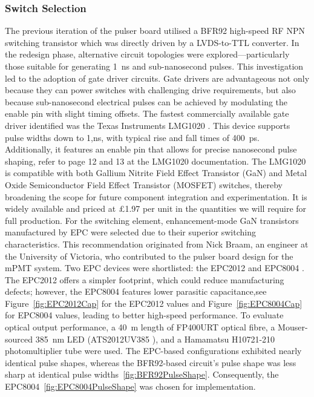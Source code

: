\documentclass[a4paper,11pt]{article}
\begin{document}
\subsubsection{Switch Selection}

The previous iteration of the pulser board utilised a BFR92 \cite{BFR92} high-speed RF NPN switching transistor which was directly driven by a LVDS-to-TTL converter. In the redesign phase, alternative circuit topologies were explored—particularly those suitable for generating 1~ns and sub-nanosecond pulses. This investigation led to the adoption of gate driver circuits. Gate drivers are advantageous not only because they can power switches with challenging drive requirements, but also because sub-nanosecond electrical pulses can be achieved by modulating the enable pin with slight timing offsets. 
The fastest commercially available gate driver identified was the Texas Instruments LMG1020 \cite{LMG1020}. This device supports pulse widths down to 1,ns, with typical rise and fall times of 400~ps. Additionally, it features an enable pin that allows for precise nanosecond pulse shaping, refer to page 12 and 13 at the LMG1020 documentation. The LMG1020 is compatible with both Gallium Nitrite Field Effect Transistor (GaN)  and Metal Oxide Semiconductor Field Effect Transistor (MOSFET) switches, thereby broadening the scope for future component integration and experimentation. It is widely available and priced at £1.97 per unit in the quantities we will require for full production.
For the switching element, enhancement-mode GaN transistors manufactured by EPC were selected due to their superior switching characteristics. This recommendation originated from Nick Braam, an engineer at the University of Victoria, who contributed to the pulser board design for the mPMT system. Two EPC devices were shortlisted: the EPC2012 \cite{EPC2012} and EPC8004 \cite{EPC8004}. The EPC2012 offers a simpler footprint, which could reduce manufacturing defects; however, the EPC8004 features lower parasitic capacitance,see Figure~\ref{fig:EPC2012Cap} for the EPC2012 values and Figure~\ref{fig:EPC8004Cap} for EPC8004 values, leading to better high-speed performance.
To evaluate optical output performance, a 40~m length of FP400URT \cite{FP400URT} optical fibre, a Mouser-sourced 385~nm LED (ATS2012UV385 \cite{ATS2012UV385}), and a Hamamatsu H10721-210 \cite{H10721-210} photomultiplier tube were used. The EPC-based configurations exhibited nearly identical pulse shapes, whereas the BFR92-based circuit's pulse shape was less sharp at identical pulse widths~\ref{fig:BFR92PulseShape}. Consequently, the EPC8004~\ref{fig:EPC8004PulseShape} was chosen for implementation.
\end{document}
